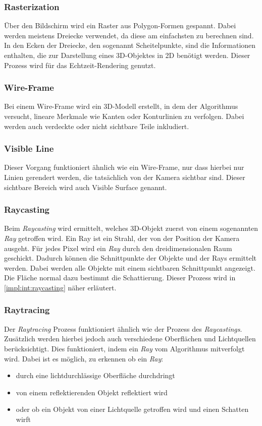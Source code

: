 \subsubsection{Rasterization}
Über den Bildschirm wird ein Raster aus Polygon-Formen gespannt. Dabei werden meistens Dreiecke verwendet, da diese am einfachsten zu berechnen sind. In den Ecken der Dreiecke, den sogenannt Scheitelpunkte, sind die Informationen enthalten, die zur Darstellung eines 3D-Objektes in 2D benötigt werden. Dieser Prozess wird für das Echtzeit-Rendering genutzt. \cite{RayTracingRasterization}

\subsubsection{Wire-Frame}
Bei einem Wire-Frame wird ein 3D-Modell erstellt, in dem der Algorithmus versucht, lineare Merkmale wie Kanten oder Konturlinien zu verfolgen. Dabei werden auch verdeckte oder nicht sichtbare Teile inkludiert. 
\cite{Rendering3DModels} 

\subsubsection{Visible Line}
Dieser Vorgang funktioniert ähnlich wie ein Wire-Frame, nur dass hierbei nur Linien gerendert werden, die tatsächlich von der Kamera sichtbar sind. Dieser sichtbare Bereich wird auch Visible Surface genannt. 
\cite{Rendering3DModels} 

\subsubsection{Raycasting}
\label{impl:rend:raycasting}
Beim \emph{Raycasting} wird ermittelt, welches 3D-Objekt zuerst von einem sogenannten \emph{Ray} getroffen wird. Ein Ray ist ein Strahl, der von der Position der Kamera ausgeht. Für jedes Pixel wird ein \emph{Ray} durch den dreidimensionalen Raum geschickt. Dadurch können die Schnittpunkte der Objekte und der Rays ermittelt werden. Dabei werden alle Objekte mit einem sichtbaren Schnittpunkt angezeigt. Die Fläche normal dazu bestimmt die Schattierung. Dieser Prozess wird in \ref{impl:int:raycasting} näher erläutert.
\cite{Rendering3DModels} 

\subsubsection{Raytracing}
Der \emph{Raytracing} Prozess funktioniert ähnlich wie der Prozess des \emph{Raycastings}. Zusätzlich werden hierbei jedoch auch verschiedene Oberflächen und Lichtquellen berücksichtigt. Dies funktioniert, indem ein \emph{Ray} vom Algorithmus mitverfolgt wird. Dabei ist es möglich, zu erkennen ob ein \emph{Ray}:
\begin{itemize}
    \item durch eine lichtdurchlässige Oberfläche durchdringt
    \item von einem reflektierenden Objekt reflektiert wird
    \item oder ob ein Objekt von einer Lichtquelle getroffen wird und einen Schatten wirft
\end{itemize}
\cite{RayTracingRasterization}

